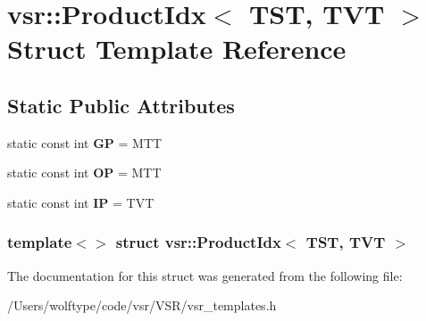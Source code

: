 \hypertarget{structvsr_1_1_product_idx_3_01_t_s_t_00_01_t_v_t_01_4}{\section{vsr\-:\-:Product\-Idx$<$ T\-S\-T, T\-V\-T $>$ Struct Template Reference}
\label{structvsr_1_1_product_idx_3_01_t_s_t_00_01_t_v_t_01_4}
}
\subsection*{Static Public Attributes}
\begin{DoxyCompactItemize}
\item 
\hypertarget{structvsr_1_1_product_idx_3_01_t_s_t_00_01_t_v_t_01_4_a38f773bee199430ae57de91756fe5195}{static const int {\bfseries G\-P} = M\-T\-T}\label{structvsr_1_1_product_idx_3_01_t_s_t_00_01_t_v_t_01_4_a38f773bee199430ae57de91756fe5195}

\item 
\hypertarget{structvsr_1_1_product_idx_3_01_t_s_t_00_01_t_v_t_01_4_aead788c481c9500bac3bafe2fb8f5fdf}{static const int {\bfseries O\-P} = M\-T\-T}\label{structvsr_1_1_product_idx_3_01_t_s_t_00_01_t_v_t_01_4_aead788c481c9500bac3bafe2fb8f5fdf}

\item 
\hypertarget{structvsr_1_1_product_idx_3_01_t_s_t_00_01_t_v_t_01_4_ac6bc9ed092b08ea7a32add0e98455aba}{static const int {\bfseries I\-P} = T\-V\-T}\label{structvsr_1_1_product_idx_3_01_t_s_t_00_01_t_v_t_01_4_ac6bc9ed092b08ea7a32add0e98455aba}

\end{DoxyCompactItemize}
\subsubsection*{template$<$$>$ struct vsr\-::\-Product\-Idx$<$ T\-S\-T, T\-V\-T $>$}



The documentation for this struct was generated from the following file\-:\begin{DoxyCompactItemize}
\item 
/\-Users/wolftype/code/vsr/\-V\-S\-R/vsr\-\_\-templates.\-h\end{DoxyCompactItemize}
